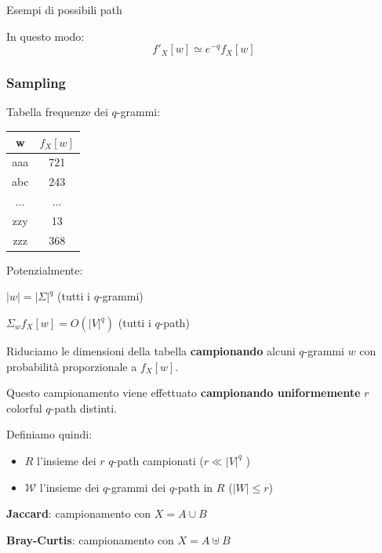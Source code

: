 \begin{frame}
\begin{minipage}{.45\textwidth}
			Esempi di possibili path\medskip
			
			In questo modo:
			\begin{equation*}
				f'_X[w] \simeq e^{-q} f_X[w]
			\end{equation*}
			\hfill
		\end{minipage}\hfill

\end{frame}

\begin{frame}
	\frametitle{Sampling}
	\centering
	
	\pause
	
	\begin{minipage}{.45\textwidth}
		\centering
		
		Tabella frequenze dei $q$-grammi: \medskip
		
		\begin{tabular}{|c|c|}
			\hline
			w   & $f_X[w]$  \\ \hline
			aaa &  721 \\ \hline
			abc &  243 \\ \hline
			... & ... \\ \hline
			zzy &   13 \\ \hline
			zzz &   368 \\ \hline
		\end{tabular}
	
		\medskip
		Potenzialmente:
		\medskip		 
		
		$|w| = |\Sigma|^q$ (tutti i $q$-grammi)
		\medskip		 
		 
		$\Sigma_w{f_X[w]} = O(|V|^q)$ (tutti i $q$-path)
		
		
	\end{minipage}\hfill
	\pause
	\begin{minipage}{.45\textwidth}
		\centering
		
		\small
		
		Riduciamo le dimensioni della tabella \textbf{campionando} alcuni $q$-grammi $w$ con probabilità proporzionale a $f_X[w]$.\medskip
		
		\pause
		
		Questo campionamento viene effettuato \textbf{campionando uniformemente} $r$ colorful $q$-path distinti.\medskip
		
		Definiamo quindi:
		
		\begin{itemize}
			\item $R$ l'insieme dei $r$ $q$-path campionati ($r \ll |V|^q$ )
			\item $\mathcal{W}$ l'insieme dei $q$-grammi dei $q$-path in $R$ ($|W| \leq r$)
		\end{itemize}
		
		
		
		\hfill
	\end{minipage}\hfill

	\pause

	\bigskip
	
	\textbf{Jaccard}: campionamento con $X = A \cup B$
	
	\textbf{Bray-Curtis}: campionamento con $X = A \uplus B$
	
\end{frame}


